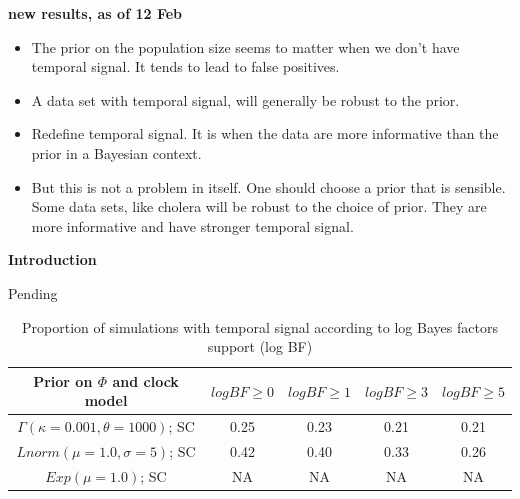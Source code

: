 \documentclass[11pt]{article}
\begin{document}
\textbf{new results, as of 12 Feb}
\begin{itemize}
	\item The prior on the population size seems to matter when we don't have temporal signal. It tends to lead to false positives. 
	\item A data set with temporal signal, will generally be robust to the prior. 
	\item Redefine temporal signal. It is when the data are more informative than the prior in a Bayesian context.
	\item But this is not a problem in itself. One should choose a prior that is sensible. Some data sets, like cholera will be robust to the choice of prior. They are more informative and have stronger temporal signal. 
\end{itemize}





\begin{Large}
	\textbf{Introduction}
\end{Large}

Pending


\begin{table}[H]
\caption{Proportion of simulations with temporal signal according to log Bayes factors support (log BF)}
\begin{center} 
	\label{table:logBF_pp_correspondence}
	\begin{tabular}{c|c|c|c|c}
		Prior on $\Phi$ and clock model & $log BF\ge0$ & $log BF\ge1$ & $log BF\ge3$ & $log BF\ge5$\\
		\hline
		$\Gamma(\kappa=0.001, \theta=1000)$; SC & 0.25 & 0.23 & 0.21 & 0.21 \\
		$Lnorm(\mu=1.0, \sigma=5)$; SC & 0.42 & 0.40 & 0.33 & 0.26 \\
		$Exp(\mu=1.0)$; SC & NA & NA & NA & NA \\
	\end{tabular}
\end{center}	\vspace{-0.4cm}
\end{table}
\end{document}
